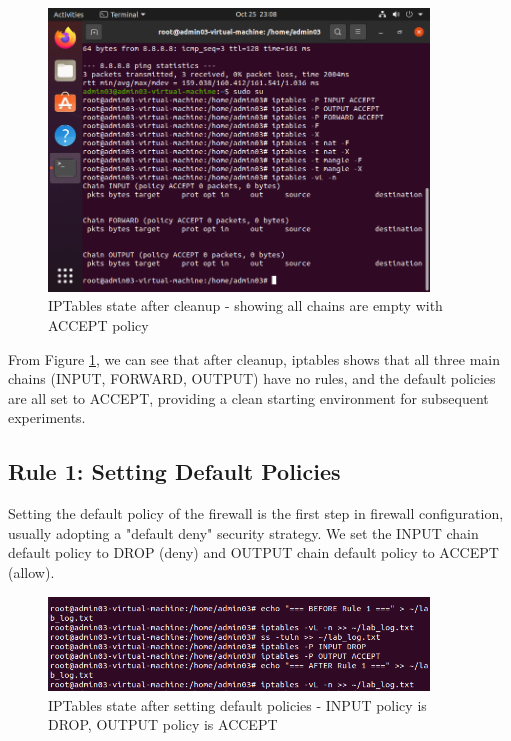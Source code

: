 \documentclass[12pt,a4paper]{article}
\begin{document}
\begin{figure}[H]
    \centering
    \includegraphics[width=0.9\textwidth]{02_clean_iptable.png}
    \caption{IPTables state after cleanup - showing all chains are empty with ACCEPT policy}
    \label{fig:clean_iptables}
\end{figure}

From Figure \ref{fig:clean_iptables}, we can see that after cleanup, iptables shows that all three main chains (INPUT, FORWARD, OUTPUT) have no rules, and the default policies are all set to ACCEPT, providing a clean starting environment for subsequent experiments.

\subsection{Rule 1: Setting Default Policies}

Setting the default policy of the firewall is the first step in firewall configuration, usually adopting a "default deny" security strategy. We set the INPUT chain default policy to DROP (deny) and OUTPUT chain default policy to ACCEPT (allow).

\begin{figure}[H]
    \centering
    \includegraphics[width=0.9\textwidth]{03_default_policy.png}
    \caption{IPTables state after setting default policies - INPUT policy is DROP, OUTPUT policy is ACCEPT}
    \label{fig:default_policy}
\end{figure}
\end{document}
